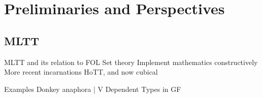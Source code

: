 \documentclass{beamer}
\begin{document}
\begin{frame}[fragile]
\centering 


\end{frame}

\begin{frame}[fragile]
\centering 

\end{frame}

\section{Preliminaries and Perspectives}

\subsection{MLTT}

\begin{frame}

MLTT and its relation to FOL
Set theory
Implement mathematics constructively
More recent incarnations HoTT, and now cubical

\end{frame}

\begin{frame}

  Examples
Donkey anaphora
|
V
Dependent Types in GF

\end{frame}
\end{document}
